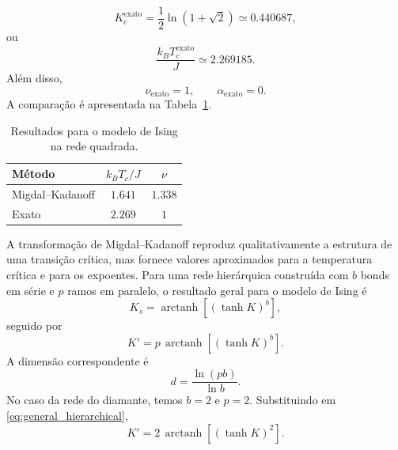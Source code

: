 \documentclass[12pt,a4paper]{article}
\begin{document}
%
\begin{equation}
    K_c^{\mathrm{exato}}
    =
    \frac12\ln(1+\sqrt2)
    \simeq0.440687,
\end{equation}
%
ou
%
\begin{equation}
    \boxed{
    \frac{k_BT_c^{\mathrm{exato}}}{J}
    \simeq2.269185.
    }
\end{equation}
%
Além disso,
%
\begin{equation}
    \nu_{\mathrm{exato}}=1,
    \qquad
    \alpha_{\mathrm{exato}}=0.
\end{equation}
%
A comparação é apresentada na Tabela~\ref{tab:comparison_p1}.
%
\begin{table}[H]
    \centering
    \caption{Resultados para o modelo de Ising na rede quadrada.}
    \label{tab:comparison_p1}
    \begin{tabular}{lcc}
        \toprule
        Método
        & \(k_BT_c/J\)
        & \(\nu\) \\
        \midrule
        Migdal--Kadanoff
        & \(1.641\)
        & \(1.338\) \\
        Exato
        & \(2.269\)
        & \(1\) \\
        \bottomrule
    \end{tabular}
\end{table}
%
A transformação de Migdal--Kadanoff reproduz qualitativamente a estrutura de uma transição crítica, mas fornece valores aproximados para a temperatura crítica e para os expoentes. Para uma rede hierárquica construída com \(b\) bonds em série e \(p\) ramos em paralelo, o resultado geral para o modelo de Ising é
%
\begin{equation}
    K_s
    =
    \operatorname{arctanh}
    \left[
        (\tanh K)^b
    \right],
    \label{eq:Ks_general_p1}
\end{equation}
%
seguido por
%
\begin{equation}
    \boxed{
    K'
    =
    p\,\operatorname{arctanh}
    \left[
        (\tanh K)^b
    \right].
    }
    \label{eq:general_hierarchical}
\end{equation}
%
A dimensão correspondente é
%
\begin{equation}
    d
    =
    \frac{\ln(pb)}{\ln b}.
    \label{eq:dim_general_p1}
\end{equation}
%
No caso da rede do diamante, temos \(b=2\) e \(p=2\). Substituindo em
\eqref{eq:general_hierarchical},
%
\begin{equation}
    K'
    =
    2\,\operatorname{arctanh}
    \left[
        (\tanh K)^2
    \right].
\end{equation}
\end{document}

